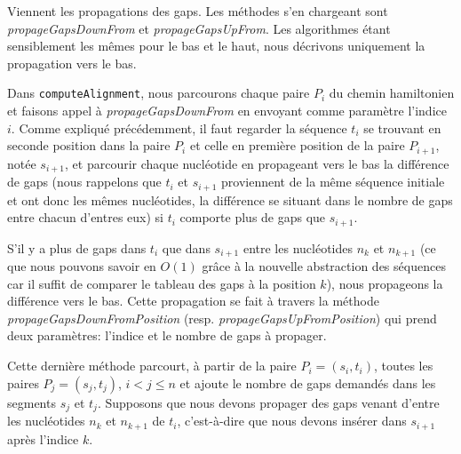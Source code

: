 Viennent les propagations des gaps.
Les méthodes s'en chargeant sont
\emph{propageGapsDownFrom} et \emph{propageGapsUpFrom}. Les algorithmes étant
sensiblement les mêmes pour le bas et le haut, nous décrivons uniquement la
propagation vers le bas.

Dans \verb|computeAlignment|, nous parcourons chaque paire $P_{i}$ du chemin
hamiltonien et faisons appel à \emph{propageGapsDownFrom} en envoyant comme
paramètre l'indice $i$. Comme expliqué précédemment, il faut regarder la
séquence $t_{i}$ se trouvant en seconde position dans la paire $P_{i}$ et celle en
première position de la paire $P_{i + 1}$, notée $s_{i + 1}$, et parcourir chaque nucléotide en
propageant vers le bas la différence de gaps (nous rappelons que $t_{i}$ et
$s_{i + 1}$ proviennent de la même séquence initiale et ont donc les mêmes
nucléotides, la différence se situant dans le nombre de gaps entre
chacun d'entres eux) si $t_{i}$ comporte plus de gaps que $s_{i + 1}$.

S'il y a plus de gaps dans $t_{i}$ que dans $s_{i + 1}$ entre les
nucléotides $n_{k}$ et $n_{k + 1}$ (ce que nous pouvons savoir en $O(1)$ grâce à
la nouvelle abstraction des séquences car il suffit de comparer le tableau des
gaps à la position $k$), nous propageons la différence vers le bas.
Cette propagation se fait à travers la méthode
\emph{propageGapsDownFromPosition} (resp. \emph{propageGapsUpFromPosition}) qui
prend deux paramètres: l'indice et le nombre de gaps à propager.

Cette dernière méthode parcourt, à partir de la paire $P_{i} = (s_{i}, t_{i})$,
toutes les paires $P_{j} = (s_{j}, t_{j})$, $i < j \leq n$ et ajoute le nombre
de gaps demandés dans les segments $s_{j}$ et $t_{j}$. Supposons que nous devons
propager des gaps venant d'entre les nucléotides $n_{k}$ et $n_{k + 1}$ de
$t_{i}$, c'est-à-dire que nous devons insérer dans $s_{i + 1}$ après l'indice
$k$.

